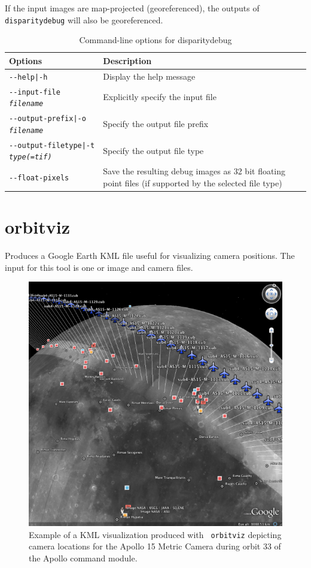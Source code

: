 If the input images are map-projected (georeferenced), the outputs
of \texttt{disparitydebug} will also be georeferenced.

\begin{longtable}{|l|p{10cm}|}
\caption{Command-line options for disparitydebug}
\label{tbl:disparitydebug}
\endfirsthead
\endhead
\endfoot
\endlastfoot
\hline
Options & Description \\ \hline \hline
\texttt{-\/-help|-h} & Display the help message\\ \hline
\texttt{-\/-input-file \textit{filename}} & Explicitly specify the input file \\ \hline
\texttt{-\/-output-prefix|-o \textit{filename}} & Specify the output file prefix \\ \hline
\texttt{-\/-output-filetype|-t \textit{type(=tif)}} & Specify the output file type \\ \hline
\texttt{-\/-float-pixels} & Save the resulting debug images as 32 bit floating point files (if supported by the selected file type) \\ \hline
\end{longtable}

\section{orbitviz}
\label{orbitviz}

Produces a Google Earth \ac{KML} file useful for visualizing camera
positions. The input for this tool is one or image and camera files.

\begin{figure}[!b]
  \begin{center}
  \includegraphics[width=6in]{images/orbitviz_ge_result_600px.png}
  \end{center}
  \caption{ Example of a \ac{KML} visualization produced with {\tt
      orbitviz} depicting camera locations for the Apollo 15 Metric
    Camera during orbit 33 of the Apollo command module.}
  \label{fig:orbitviz_example}
\end{figure}

